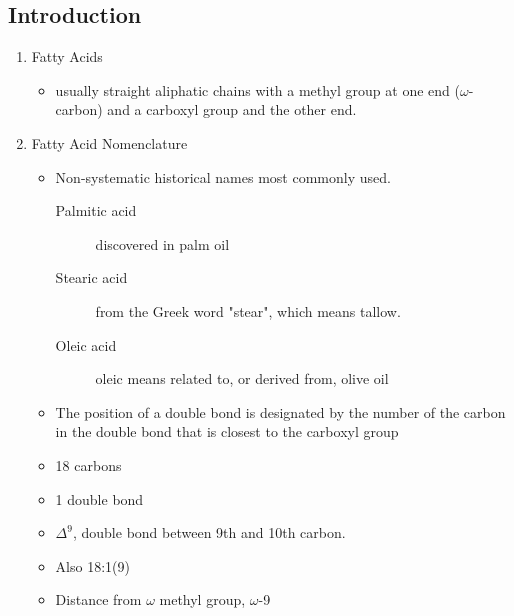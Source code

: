 \documentclass{scrartcl}
\begin{document}
\subsection{Introduction}
\label{sec:org1068265}
\begin{enumerate}
\item Fatty Acids
\label{sec:org773c31b}
\begin{itemize}
\item usually straight aliphatic chains with a methyl group at one end
(\(\omega\)-carbon) and a carboxyl group and the other end.
\end{itemize}


\item Fatty Acid Nomenclature
\label{sec:orgb0938b1}
\begin{itemize}
\item Non-systematic historical names most commonly used.
\begin{description}
\item[{Palmitic acid}] discovered in palm oil
\item[{Stearic acid}] from the Greek word "stear", which means tallow.
\item[{Oleic acid}] oleic means related to, or derived from, olive oil
\end{description}
\item The position of a double bond is designated by the number of the carbon in the double bond that is closest to the carboxyl group
\end{itemize}



\begin{itemize}
\item 18 carbons
\item 1 double bond
\item \(\Delta^{\text{9}}\), double bond between 9th and 10th carbon.
\item Also 18:1(9)
\item Distance from \(\omega\) methyl group, \(\omega\)-9
\end{itemize}


\end{enumerate}
\end{document}
